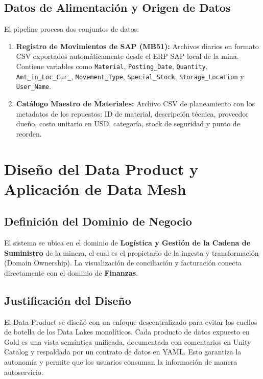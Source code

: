 \documentclass[11pt,a4paper]{article}
\begin{document}
\subsection{Datos de Alimentación y Origen de Datos}
El pipeline procesa dos conjuntos de datos:
\begin{enumerate}
    \item \textbf{Registro de Movimientos de SAP (MB51):} Archivos diarios en formato CSV exportados automáticamente desde el ERP SAP local de la mina. Contiene variables como \texttt{Material}, \texttt{Posting\_Date}, \texttt{Quantity}, \texttt{Amt\_in\_Loc\_Cur\_}, \texttt{Movement\_Type}, \texttt{Special\_Stock}, \texttt{Storage\_Location} y \texttt{User\_Name}.
    \item \textbf{Catálogo Maestro de Materiales:} Archivo CSV de planeamiento con los metadatos de los repuestos: ID de material, descripción técnica, proveedor dueño, costo unitario en USD, categoría, stock de seguridad y punto de reorden.
\end{enumerate}

\newpage
\section{Diseño del Data Product y Aplicación de Data Mesh}

\subsection{Definición del Dominio de Negocio}
El sistema se ubica en el dominio de \textbf{Logística y Gestión de la Cadena de Suministro} de la minera, el cual es el propietario de la ingesta y transformación (Domain Ownership). La visualización de conciliación y facturación conecta directamente con el dominio de \textbf{Finanzas}.

\subsection{Justificación del Diseño}
El Data Product se diseñó con un enfoque descentralizado para evitar los cuellos de botella de los Data Lakes monolíticos. Cada producto de datos expuesto en Gold es una vista semántica unificada, documentada con comentarios en Unity Catalog y respaldada por un contrato de datos en YAML. Esto garantiza la autonomía y permite que los usuarios consuman la información de manera autoservicio.
\end{document}
